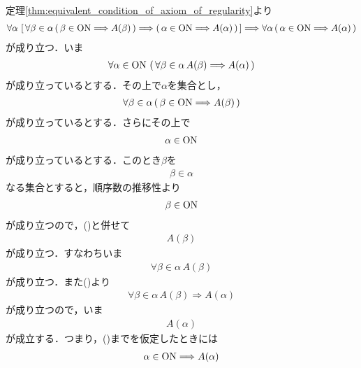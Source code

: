 	\begin{prf}
		定理\ref{thm:equivalent_condition_of_axiom_of_regularity}より
		\begin{align}
			\forall \alpha\, \left[\, \forall \beta \in \alpha\, (\, \beta \in \mathrm{ON} \Longrightarrow A(\beta)\, )
			\Longrightarrow (\, \alpha \in \mathrm{ON} \Longrightarrow A(\alpha)\, )\, \right]
			\Longrightarrow \forall \alpha\, (\, \alpha \in \mathrm{ON} \Longrightarrow A(\alpha)\, )
			\label{fom:thm_transfinite_induction}
		\end{align}
		が成り立つ．いま
		\begin{align}
			\forall \alpha \in \mathrm{ON}\, \left(\, \forall \beta \in \alpha\, A(\beta) \Longrightarrow A(\alpha)\, \right)
			\label{fom:thm_transfinite_induction_1}
		\end{align}
		が成り立っているとする．その上で$\alpha$を集合とし，
		\begin{align}
			\forall \beta \in \alpha\, (\, \beta \in \mathrm{ON} \Longrightarrow A(\beta)\, )
			\label{fom:thm_transfinite_induction_2}
		\end{align}
		が成り立っているとする．さらにその上で
		\begin{align}
			\alpha \in \mathrm{ON}
		\end{align}
		が成り立っているとする．このとき$\beta$を
		\begin{align}
			\beta \in \alpha
		\end{align}
		なる集合とすると，順序数の推移性より
		\begin{align}
			\beta \in \mathrm{ON}
		\end{align}
		が成り立つので，()と併せて
		\begin{align}
			A(\beta)
		\end{align}
		が成り立つ．すなわちいま
		\begin{align}
			\forall \beta \in \alpha\, A(\beta)
		\end{align}
		が成り立つ．また()より
		\begin{align}
			\forall \beta \in \alpha\, A(\beta) \Longrightarrow A(\alpha)
		\end{align}
		が成り立つので，いま
		\begin{align}
			A(\alpha)
		\end{align}
		が成立する．つまり，()までを仮定したときには
		\begin{align}
			\alpha \in \mathrm{ON} \Longrightarrow A(\alpha)
		\end{align}

\end{prf}
